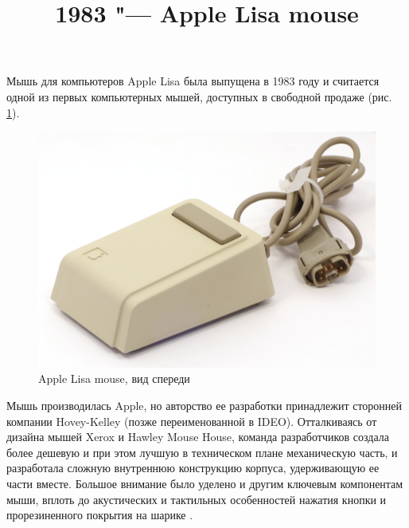 \documentclass[11pt, a4paper]{article}
\begin{document}
\title{1983 "--- Apple Lisa mouse}
\date{}
\maketitle

Мышь для компьютеров Apple Lisa была выпущена в 1983 году и считается одной из первых компьютерных мышей, доступных в свободной продаже (рис. \ref{fig:AppleLisaPic}).

\begin{figure}[h]
   \centering
    \includegraphics[scale=0.5]{1983_apple_lisa_mouse/applenorm_30.jpg}
    \caption{Apple Lisa mouse, вид спереди}
    \label{fig:AppleLisaPic}
\end{figure}

Мышь производилась Apple, но авторство ее разработки принадлежит сторонней компании Hovey-Kelley (позже переименованной в IDEO). Отталкиваясь от дизайна мышей Xerox и Hawley Mouse House, команда разработчиков создала более дешевую и при этом лучшую в техническом плане механическую часть, и разработала сложную внутреннюю конструкцию корпуса, удерживающую ее части вместе. Большое внимание было уделено и другим ключевым компонентам мыши, вплоть до акустических и тактильных особенностей нажатия кнопки и прорезиненного покрытия на шарике \cite{ideo}.
\end{document}
